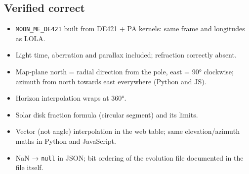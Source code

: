 \documentclass[11pt,a4paper]{article}
\providecommand{\tightlist}{\setlength{\itemsep}{0pt}\setlength{\parskip}{0pt}}
\begin{document}
\hypertarget{verified-correct}{%
\subsection{Verified correct}\label{verified-correct}}

\begin{itemize}
\tightlist
\item
  \texttt{MOON\_ME\_DE421} built from DE421 + PA
  kernels: same frame and longitudes as LOLA.
\item
  Light time, aberration and parallax included; refraction correctly
  absent.
\item
  Map-plane north = radial direction from the pole, east = 90°
  clockwise; azimuth from north towards east everywhere (Python and JS).
\item
  Horizon interpolation wraps at 360°.
\item
  Solar disk fraction formula (circular segment) and its limits.
\item
  Vector (not angle) interpolation in the web table; same
  elevation/azimuth maths in Python and JavaScript.
\item
  NaN → \texttt{null} in JSON; bit ordering of the
  evolution file documented in the file itself.
\end{itemize}
\end{document}
